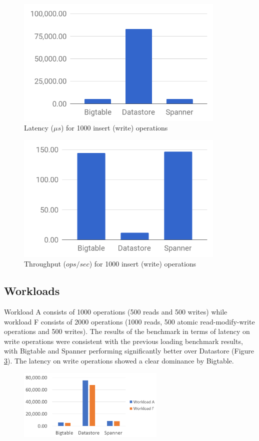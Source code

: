 \documentclass[bsc,frontabs,twoside,singlespacing,parskip,deptreport]{infthesis}     %
\begin{document}
\begin{figure}[ht]
	\centering
	\includegraphics[width=10cm]{load-latency}
	\caption{Latency (\( \mu s\)) for 1000 insert (write) operations}
	\label{load-latency}
\end{figure}
\begin{figure}[ht]
	\centering
	\includegraphics[width=10cm]{load-throughput}
	\caption{Throughput (\(ops/sec\)) for 1000 insert (write) operations}
	\label{load-throughput}
\end{figure}

\subsection{Workloads}

Workload A consists of 1000 operations (500 reads and 500 writes) while workload F consists of 2000 operations (1000 reads, 500 atomic read-modify-write operations and 500 writes). The results of the benchmark in terms of latency on write operations were consistent with the previous loading benchmark results, with Bigtable and Spanner performing significantly better over Datastore (Figure \ref{write-latency}). The latency on write operations showed a clear dominance by Bigtable. 

\begin{figure}
	\centering
	\includegraphics[width=7cm]{write-latency}
	\caption{}
	\label{write-latency}
\end{figure}
\end{document}
